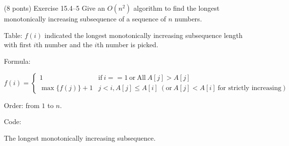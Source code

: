 \documentclass[paper=a4, fontsize=11pt]{scrartcl} %
\begin{document}
\maketitle %

\section{}

\begin{fancyquotes}
  (8 ponts) Exercise 15.4--5 Give an $O(n^2)$ algorithm to find the
  longest monotonically increasing subsequence of a sequence of $n$
  numbers.
\end{fancyquotes}

Table: $f(i)$ indicated the longest monotonically increasing
subsequence length with first $i$th number and the $i$th number is
picked.

Formula:

\begin{equation*}
  f(i)=
  \begin{cases}
    1 & \text{if}\ i==1\ \text{or}\ \text{All}\ A[j]>A[j] \\
    \max\{f(j)\}+1 & j<i, A[j]\leq A[i]\ (\text{or}\ A[j]<A[i]\ \text{for
    strictly increasing})
  \end{cases}
\end{equation*}

Order: from $1$ to $n$.

Code:

\begin{algorithm}[H]
  \caption{The longest monotonically increasing subsequence.}
\end{algorithm}

\pagebreak

\section{}
\end{document}
